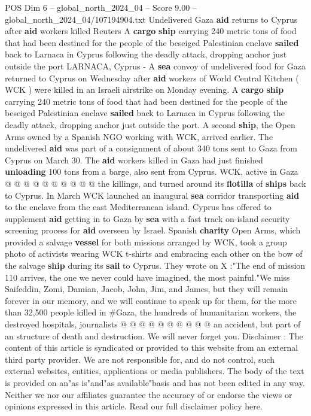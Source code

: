 \begin{textsample}{POS Dim 6 – global\_north\_2024\_04 – Score 9.00 – global\_north\_2024\_04/107194904.txt}  \label{ex:f6_pos_079}
Undelivered Gaza \textbf{aid} returns to Cyprus after \textbf{aid} workers killed Reuters A \textbf{cargo} \textbf{ship} carrying 240 metric tons of food that had been destined for the people of the beseiged Palestinian enclave \textbf{sailed} back to Larnaca in Cyprus following the deadly attack, dropping anchor just outside the port LARNACA, Cyprus - A \textbf{sea} convoy of undelivered food for Gaza returned to Cyprus on Wednesday after \textbf{aid} workers of World Central Kitchen ( WCK ) were killed in an Israeli airstrike on Monday evening.
A \textbf{cargo} \textbf{ship} carrying 240 metric tons of food that had been destined for the people of the beseiged Palestinian enclave \textbf{sailed} back to Larnaca in Cyprus following the deadly attack, dropping anchor just outside the port.
A second \textbf{ship}, the Open Arms owned by a Spanish NGO working with WCK, arrived earlier.
The undelivered \textbf{aid} was part of a consignment of about 340 tons sent to Gaza from Cyprus on March 30.
The \textbf{aid} workers killed in Gaza had just finished \textbf{unloading} 100 tons from a barge, also sent from Cyprus.
WCK, active in Gaza @ @ @ @ @ @ @ @ @ @ the killings, and turned around its \textbf{flotilla} of \textbf{ships} back to Cyprus.
In March WCK launched an inaugural \textbf{sea} corridor transporting \textbf{aid} to the enclave from the east Mediterranean island.
Cyprus has offered to supplement \textbf{aid} getting in to Gaza by \textbf{sea} with a fast track on-island security screening process for \textbf{aid} overseen by Israel.
Spanish \textbf{charity} Open Arms, which provided a salvage \textbf{vessel} for both missions arranged by WCK, took a group photo of activists wearing WCK t-shirts and embracing each other on the bow of the salvage \textbf{ship} during its \textbf{sail} to Cyprus.
They wrote on X :"The end of mission 110 arrives, the one we never could have imagined, the most painful."We miss Saifeddin, Zomi, Damian, Jacob, John, Jim, and James, but they will remain forever in our memory, and we will continue to speak up for them, for the more than 32,500 people killed in \#Gaza, the hundreds of humanitarian workers, the destroyed hospitals, journalists @ @ @ @ @ @ @ @ @ @ an accident, but part of an structure of death and destruction.
We will never forget you.
Disclaimer : The content of this article is syndicated or provided to this website from an external third party provider.
We are not responsible for, and do not control, such external websites, entities, applications or media publishers.
The body of the text is provided on an"as is"and"as available"basis and has not been edited in any way.
Neither we nor our affiliates guarantee the accuracy of or endorse the views or opinions expressed in this article.
Read our full disclaimer policy here.

\end{textsample}
